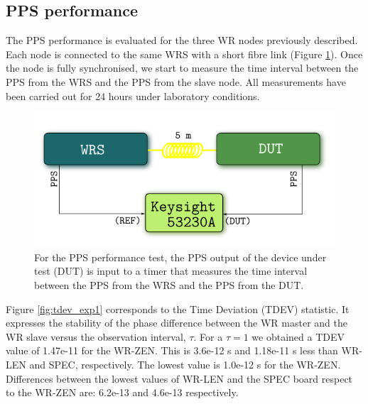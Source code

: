 
\subsection{PPS performance}
\label{subsec:pps_performance}

The PPS performance is evaluated for the three WR nodes previously described. 
Each node is connected to the same WRS with a short fibre link (Figure 
\ref{fig:prueba1pps}). Once the node is fully synchronised, we start to 
measure the time interval between the PPS from the WRS and the PPS from the 
slave node. All measurements have been carried out for 24 hours under laboratory conditions.

\begin{figure}[H]
	\centering
	\includegraphics[width=0.7\linewidth]{img/prueba1_pps}
	\caption[Connection diagram for the PPS performance test.]{For the PPS 
	performance test, the PPS output of the device under test (DUT) is input to 
	a timer that measures the time interval between the PPS from the WRS and 
	the PPS from the DUT.}
	\label{fig:prueba1pps}
\end{figure}


Figure \ref{fig:tdev_exp1} corresponds to the Time Deviation (TDEV) statistic. 
It expresses the stability of the phase difference between the WR master and the 
WR slave versus the observation interval, $\tau$. For a $\tau=1$ we obtained a 
TDEV value of 1.47e-11 for the WR-ZEN. This is 3.6e-12 s and 1.18e-11 s less than WR-LEN and SPEC, respectively. The lowest value is 1.0e-12 s for the WR-ZEN. Differences between the lowest values of WR-LEN and the SPEC board respect to the WR-ZEN are: 6.2e-13 and 4.6e-13 respectively.


